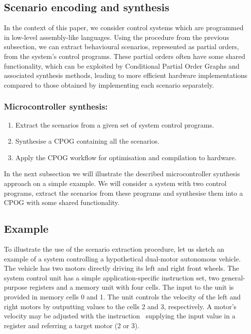 \subsection{Scenario encoding and synthesis}

In the context of this paper, we consider control systems which are programmed
in low-level assembly-like languages. Using the procedure from the previous subsection,
we can extract behavioural scenarios, represented as partial orders, from the
system's control programs. These partial orders often have some shared
functionality, which can be exploited by Conditional Partial Order Graphs and
associated synthesis methods, leading to more efficient hardware implementations
compared to those obtained by implementing each scenario separately.

\subsubsection{Microcontroller synthesis:}
\begin{enumerate}
    \item Extract the scenarios from a given set of system control programs.
    \item Synthesise a CPOG containing all the scenarios.
    \item Apply the CPOG workflow for optimisation and compilation to hardware.
\end{enumerate}


In the next subsection we will illustrate the described microcontroller
synthesis approach on a simple example. We will consider a system with two
control programs, extract the scenarios from these programs and synthesise them
into a CPOG with some shared functionality.

\subsection{Example}

To illustrate the use of the scenario extraction procedure, let us sketch an
example of a system controlling a hypothetical dual-motor autonomous vehicle.
The vehicle has two motors directly driving its left and right front wheels.
The system control unit has a simple application-specific instruction set, two
general-purpose registers and a memory unit with four cells. The input to the
unit is provided in memory cells 0 and 1. The unit controls the velocity of the
left and right motors by outputting values to the cells 2 and 3, respectively.
A motor's velocity may be adjusted with the instruction~ supplying
the input value in a register and referring a target motor (2 or 3).

